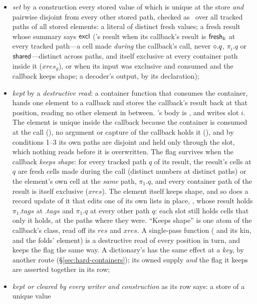 \begin{itemize}
\item \emph{set} by a construction every stored value of which is unique at the store \emph{and}
pairwise disjoint from every other stored path, checked as \Disjoint\ over all tracked paths of all
stored elements: a literal of distinct fresh values; a fresh result whose summary says $\mathsf{excl}$
('s result when its callback's result is $\mathsf{fresh}_k$ at every tracked path---a cell made
\emph{during} the callback's call, never $\diamond.q$, $\pi_i.q$ or $\mathsf{shared}$---distinct across paths, and
itself exclusive at every container path inside it ($\mathit{xres}_g$), or
when its input was exclusive and consumed and the callback keeps shape; a decoder's output, by its
declaration);
\item \emph{kept} by a \emph{destructive read}: a container function that consumes the container,
hands one element to a callback and stores the callback's result back at that position, reading no
other element in between. 's body is , and
 writes slot $i$. The element is unique inside the callback because the container is
consumed at the call (\Dead), no argument or capture of the callback holds it (\Disjoint), and by
conditions 1--3 its own paths are disjoint and held only through the slot, which nothing reads before
it is overwritten. The flag survives when the callback \emph{keeps shape}: for every tracked path $q$ of
its result, the result's cells at $q$ are fresh cells made during the call (distinct numbers at distinct
paths) or the element's own cell at the \emph{same} path, $\pi_1.q$, and every container path of the result
is itself exclusive ($\mathit{xres}$). The element itself keeps shape, and so does a record update of it
that edits one of its own lists in place, , whose result holds
$\pi_1.\mathit{tags}$ at $.\mathit{tags}$ and $\pi_1.q$ at every other path $q$: each slot still holds
cells that only it holds, at the paths where they were. ``Keeps shape'' is one atom of the callback's
class, read off its $\mathit{res}$ and $\mathit{xres}$. A single-pass function ( and its kin,
and the folds' element) is a destructive read of every position in turn, and keeps the flag the same way.
A dictionary's  has the same effect at a \emph{key}, by another route
(\S\ref{sec:hard-containers}); its owned supply \emph{and} the flag it keeps are asserted together in its
row;
\item \emph{kept or cleared by every writer and construction} as its row says: a store of a unique value

\end{itemize}
